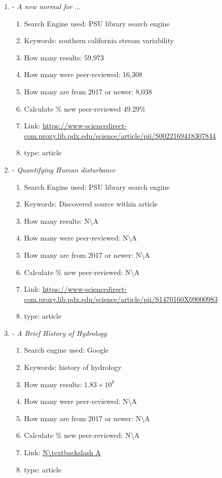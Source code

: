 \documentclass[a4paper,man,biblatex]{apa7}
\begin{document}
\begin{enumerate}
    \item \textcite{mallakpour_2018} - \textit{A new normal for} ... 
        \begin{enumerate}
            \item Search Engine used: PSU library search engine
            \item Keywords: southern california stream variability
            \item How many results: 59,973 
            \item How many were peer-reviewed: 16,308
            \item How many are from 2017 or newer: 8,038
            \item Calculate \% new peer-reviewed 49.29\%
            \item Link: \url{https://www-sciencedirect-com.proxy.lib.pdx.edu/science/article/pii/S0022169418307844}
            \item type: article 
        \end{enumerate}

    \item \textcite{falcone_2016} - \textit{Quantifying Human disturbance}
        \begin{enumerate}
            \item Search Engine used: PSU library search engine
            \item Keywords: Discovered source within \textcite{rice_2016} article
            \item How many results: N\textbackslash A 
            \item How many were peer-reviewed: N\textbackslash A
            \item How many are from 2017 or newer:  N\textbackslash A
            \item Calculate \% new peer-reviewed: N\textbackslash A
            \item Link: \url{https://www-sciencedirect-com.proxy.lib.pdx.edu/science/article/pii/S1470160X09000983}
            \item type: article 
        \end{enumerate}

    \item \textcite{bras_1999} - \textit{A  Brief  History  of  Hydrology}
        \begin{enumerate}
            \item Search engine used: Google
            \item Keywords: history of hydrology 
            \item How many results: $1.83\times 10^8$ 
            \item How many were peer-reviewed: N\textbackslash A
            \item How many are from 2017 or newer:  N\textbackslash A
            \item Calculate \% new peer-reviewed: N\textbackslash A
            \item Link: \url{N\textbackslash A}
            \item type: article 
        \end{enumerate}


\end{enumerate}
\end{document}
